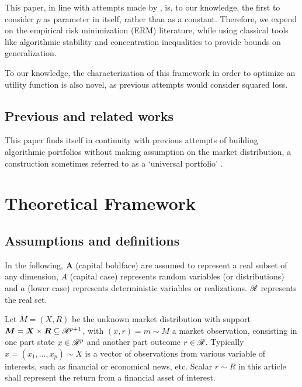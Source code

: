 \documentclass[10pt]{article}
\begin{document}
This paper, in line with attempts made by \cite{rudin2015big}, is, to our knowledge, the
first to consider $p$ as parameter in itself, rather than as a constant. Therefore, we
expend on the empirical risk minimization (ERM) literature, while using classical tools
like algorithmic stability and concentration inequalities to provide bounds on
generalization. 

To our knowledge, the characterization of this framework in order to optimize an utility
function is also novel, as previous attempts would consider squared loss.


\subsection{Previous and related works}

This paper finds itself in continuity with previous attempts of building algorithmic
portfolios without making assumption on the market distribution, a construction sometimes
referred to as a `universal portfolio' \cite{cover1991universal}.

\section{Theoretical Framework}

\subsection{Assumptions and definitions}


In the following, $\bm A$ (capital boldface) are assumed to represent a real subset of any
dimension, $A$ (capital case) represents random variables (or distributions) and $a$
(lower case) represents deterministic variables or realizations. $\mathscr{R}$ represents the
real set.

Let $M=(X,R)$ be the unknown market distribution with support
$\bm M = \bm X\times \bm R \subseteq\mathscr{R}^{p+1}$, with $(x,r) = m\sim M$ a market
observation, consisting in one part state $x\in\mathscr{R}^p$ and another part outcome
$r\in\mathscr{R}$. Typically $x=(x_1,\dots,x_p)\sim X$ is a vector of observations from various
variable of interests, such as financial or economical news, etc. Scalar $r\sim R$ in this
article shall represent the return from a financial asset of interest. 

\end{document}
